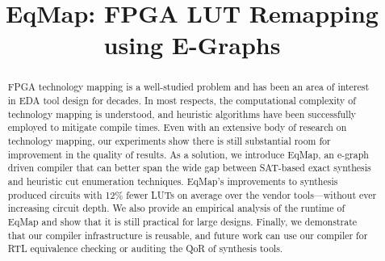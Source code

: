 \documentclass[10pt,conference]{IEEEtran}
\newcommand{\fullname}{EqMap: FPGA LUT Remapping using E-Graphs}
\newcommand{\shortname}{EqMap}
\newcommand{\metric}{12\% fewer LUTs}
\begin{document}
\title{\fullname}
\author{
}
\maketitle

\begin{abstract}
    FPGA technology mapping is a well-studied problem and has been an area of
    interest in EDA tool design for decades. In most respects, the computational
    complexity of technology mapping is understood, and heuristic algorithms have
    been successfully employed to mitigate compile times. Even with an extensive
    body of research on technology mapping, our experiments show there is still
    substantial room for improvement in the quality of results. As a solution, we
    introduce \shortname{}, an e-graph driven compiler that can better span the
    wide gap between SAT-based exact synthesis and heuristic cut enumeration
    techniques. \shortname{}'s improvements to synthesis produced circuits with
    \metric{} on average over the vendor tools---without ever increasing circuit
    depth. We also provide an empirical analysis of the runtime of \shortname{} and
    show that it is still practical for large designs. Finally, we demonstrate that
    our compiler infrastructure is reusable, and future work can use our compiler
    for RTL equivalence checking or auditing the QoR of synthesis tools.
\end{abstract}













\end{document}
